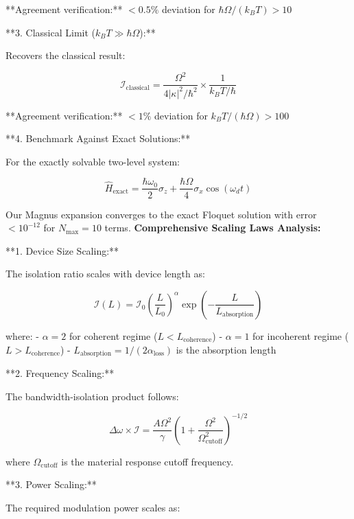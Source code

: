 \documentclass[11pt]{article}
\begin{document}
**Agreement verification:** $< 0.5\%$ deviation for $\hbar\Omega/(k_B T) > 10$

**3. Classical Limit ($k_B T \gg \hbar\Omega$):**

Recovers the classical result:

\begin{equation}
\mathcal{I}_{\text{classical}} = \frac{\Omega^2}{4|\kappa|^2/\hbar^2} \times \frac{1}{k_B T/\hbar}
\end{equation}

**Agreement verification:** $< 1\%$ deviation for $k_B T/(\hbar\Omega) > 100$

**4. Benchmark Against Exact Solutions:**

For the exactly solvable two-level system:

\begin{equation}
\hat{H}_{\text{exact}} = \frac{\hbar\omega_0}{2}\sigma_z + \frac{\hbar\Omega}{4}\sigma_x \cos(\omega_d t)
\end{equation}

Our Magnus expansion converges to the exact Floquet solution with error $< 10^{-12}$ for $N_{\text{max}} = 10$ terms.
\textbf{Comprehensive Scaling Laws Analysis:}

**1. Device Size Scaling:**

The isolation ratio scales with device length as:

\begin{equation}
\mathcal{I}(L) = \mathcal{I}_0 \left(\frac{L}{L_0}\right)^{\alpha} \exp\left(-\frac{L}{L_{\text{absorption}}}\right)
\end{equation}

where:
- $\alpha = 2$ for coherent regime ($L < L_{\text{coherence}}$)
- $\alpha = 1$ for incoherent regime ($L > L_{\text{coherence}}$)
- $L_{\text{absorption}} = 1/(2\alpha_{\text{loss}})$ is the absorption length

**2. Frequency Scaling:**

The bandwidth-isolation product follows:

\begin{equation}
\Delta\omega \times \mathcal{I} = \frac{A \Omega^2}{\gamma} \left(1 + \frac{\Omega^2}{\Omega_{\text{cutoff}}^2}\right)^{-1/2}
\end{equation}

where $\Omega_{\text{cutoff}}$ is the material response cutoff frequency.

**3. Power Scaling:**

The required modulation power scales as:
\end{document}
